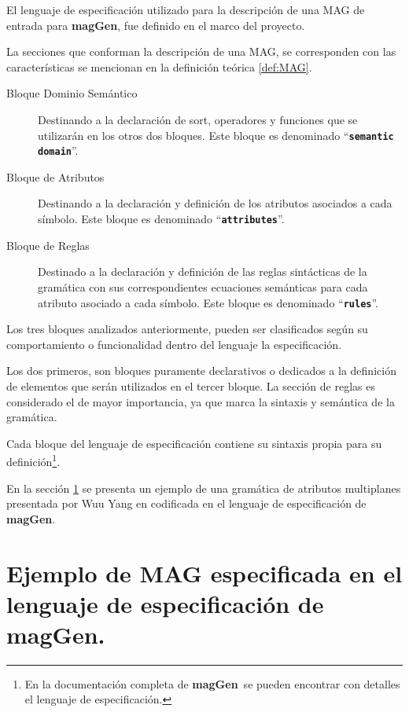 \documentclass[runningheads,a4paper]{llncs}
\newcommand{\textbtt}[1]{\texttt{\textbf{#1}}}
\newcommand{\maggen}{\textbf{magGen}}
\begin{document}
El lenguaje de especificación utilizado para la descripción de una MAG de entrada para \maggen, fue definido en el marco del proyecto.
 
La secciones que conforman la descripción de una MAG, se corresponden con las características se mencionan en la definición teórica \ref{def:MAG}.
 

\begin{description}
\item [Bloque Dominio Semántico] Destinando a la declaración de sort, operadores y funciones que se utilizarán en los otros dos bloques. Este bloque es denominado ``\textbtt{semantic domain}''.

\item [Bloque de Atributos] Destinando a la declaración y definición de los atributos asociados a cada símbolo. Este bloque es denominado ``\textbtt{attributes}''.

\item [Bloque de Reglas] Destinado a la declaración y definición de las reglas sintácticas de la gramática con sus correspondientes ecuaciones semánticas para cada atributo asociado a cada símbolo. Este bloque es denominado ``\textbtt{rules}''.
\end{description}

Los tres bloques analizados anteriormente, pueden ser clasificados según su comportamiento o funcionalidad dentro del lenguaje la especificación.

Los dos primeros, son bloques puramente declarativos o dedicados a la definición de elementos que serán utilizados en el tercer bloque. La sección de reglas es considerado el de mayor importancia, ya que marca la sintaxis y semántica de la gramática.

Cada bloque del lenguaje de especificación contiene su sintaxis propia para su definición\footnote{En la documentación completa de \maggen\ se pueden encontrar con detalles el lenguaje de especificación.}.

En la sección \ref{ej:agwuuyang} se presenta un ejemplo de una gramática de atributos multiplanes presentada por Wuu Yang en \cite{wuu-yang1} codificada en el lenguaje de especificación de \maggen.

\section{Ejemplo de MAG especificada en el lenguaje de especificación de \maggen.}
\label{ej:agwuuyang}
\end{document}
